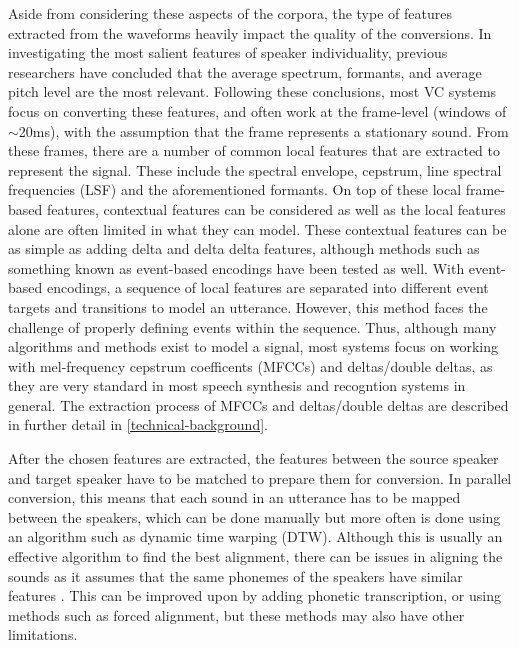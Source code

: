 \documentclass
[
    a4paper,
    twoside,
    12pt,
]
{report}
\begin{document}
Aside from considering these aspects of the corpora, the type of
features extracted from the waveforms heavily impact the quality of the
conversions. In investigating the most salient features of speaker
individuality, previous researchers have concluded that the average
spectrum, formants, and average pitch level are the most relevant.
Following these conclusions, most VC systems focus on converting these
features, and often work at the frame-level (windows of
\begin{math}\sim\end{math}20ms), with the assumption that the frame
represents a stationary sound. From these frames, there are a number of
common local features that are extracted to represent the signal. These
include the spectral envelope, cepstrum, line spectral frequencies (LSF)
and the aforementioned formants. On top of these local frame-based
features, contextual features can be considered as well as the local
features alone are often limited in what they can model. These
contextual features can be as simple as adding delta and delta delta
features, although methods such as something known as event-based
encodings have been tested as well. With event-based encodings, a
sequence of local features are separated into different event targets
and transitions to model an utterance. However, this method faces the
challenge of properly defining events within the sequence. Thus,
although many algorithms and methods exist to model a signal, most
systems focus on working with mel-frequency cepstrum coefficents (MFCCs)
and deltas/double deltas, as they are very standard in most speech
synthesis and recogntion systems in general. The extraction process of
MFCCs and deltas/double deltas are described in further detail in
\autoref{technical-background}.

After the chosen features are extracted, the features between the source
speaker and target speaker have to be matched to prepare them for
conversion. In parallel conversion, this means that each sound in an
utterance has to be mapped between the speakers, which can be done
manually but more often is done using an algorithm such as dynamic time
warping (DTW). Although this is usually an effective algorithm to find
the best alignment, there can be issues in aligning the sounds as it
assumes that the same phonemes of the speakers have similar features
\parencite{mohammadi2017}. This can be improved upon by adding phonetic
transcription, or using methods such as forced alignment, but these
methods may also have other limitations.
\end{document}
